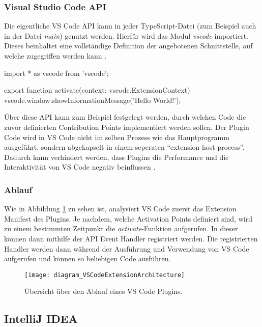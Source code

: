 \subsubsection{Visual Studio Code API} 
  Die eigentliche VS Code API kann in jeder TypeScript-Datei 
  (zum Beispiel auch in der Datei \emph{main}) genutzt werden. 
  Hierfür wird das Modul \emph{vscode} importiert. 
  Dieses beinhaltet eine vollständige Definition der angebotenen
  Schnittstelle, auf welche zugegriffen werden kann 
  \cite{VSCodeExtensionAPIExtensionAnatomy,VSCodeExtensionAPIVSCodeAPI}.
\begin{JsCode}
    import * as vscode from 'vscode';

    export function activate(context: vscode.ExtensionContext) {
      vscode.window.showInformationMessage('Hello World!');
    } 
\end{JsCode}
  Über diese API kann zum Beispiel festgelegt werden, durch welchen Code
  die zuvor definierten Contribution Points implementiert werden sollen.
  Der Plugin Code wird in VS Code nicht im selben Prozess wie das
  Hauptprogramm ausgeführt, sondern abgekapselt in einem seperaten 
  \enquote{extension host process}. Dadurch kann verhindert werden, dass
  Plugins die Performance und die Interaktivität von VS Code negativ beinflussen 
  \cite{VSCodeArchitecture,VSCodeApproachToExtensibility}.
\subsubsection{Ablauf}
  Wie in Abbildung \ref{fig:diagram_VSCodeExtensionArchitecture} zu sehen ist,
  analysiert VS Code zuerst das Extension Manifest des Plugins.
  Je nachdem, welche Activation Points definiert sind, wird zu einem
  bestimmten Zeitpunkt die \emph{activate}-Funktion aufgerufen. In dieser 
  können dann mithilfe der API Event Handler registriert werden. 
  Die registrierten Handler werden dann während der Ausführung und Verwendung
  von VS Code aufgerufen und können so beliebigen Code ausführen.
  \begin{figure}
    \centering
    \texttt{[image: diagram\_VSCodeExtensionArchitecture]}
    \caption{Übersicht über den Ablauf eines VS Code Plugins.}
    \label{fig:diagram_VSCodeExtensionArchitecture}
  \end{figure}   

\subsection{IntelliJ IDEA}

